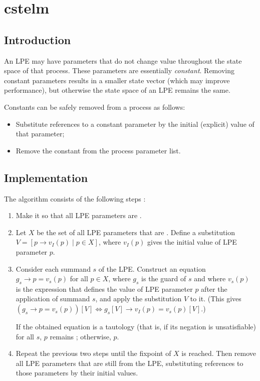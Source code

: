 \chapter{cstelm}

\section{Introduction}

An LPE may have parameters that do not change value throughout the state space of that process.
These parameters are essentially \emph{constant}.
Removing constant parameters results in a smaller state vector (which may improve performance), but otherwise the state space of an LPE remains the same.

Constants can be safely removed from a process as follows:
\begin{itemize}
\item Substitute references to a constant parameter by the initial (explicit) value of that parameter;
\item Remove the constant from the process parameter list.
\end{itemize}

\section{Implementation}

The algorithm consists of the following steps \cite{groote2001computer}:

\begin{enumerate}

\item Make it so that all LPE parameters are .

\item Let $X$ be the set of all LPE parameters that are .
Define a substitution $V = [p \rightarrow v_I(p) \;|\; p \in X]$, where $v_I(p)$ gives the initial value of LPE parameter $p$.

\item Consider each summand $s$ of the LPE.
Construct an equation $g_s \rightarrow p = v_s(p)$ for all $p \in X$, where $g_s$ is the guard of $s$ and where $v_s(p)$ is the expression that defines the value of LPE parameter $p$ after the application of summand $s$, and apply the substitution $V$ to it.
(This gives $(g_s \rightarrow p = v_s(p))[V] \Leftrightarrow {g_s}[V] \rightarrow v_I(p) = v_s(p)[V]$.)

If the obtained equation is a tautology (that is, if its negation is unsatisfiable) for all $s$, $p$ remains ; otherwise,  $p$.

\item Repeat the previous two steps until the fixpoint of $X$ is reached.
Then remove all LPE parameters that are still  from the LPE, substituting references to those parameters by their initial values.

\end{enumerate}

